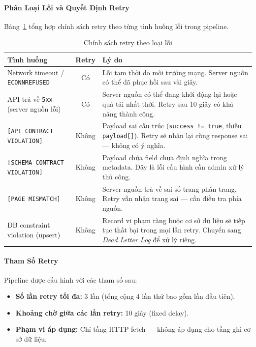 \paragraph{Phân Loại Lỗi và Quyết Định Retry}

Bảng~\ref{tab:retry-policy} tổng hợp chính sách retry theo từng tình huống
lỗi trong pipeline.

\begin{table}[H]
\centering
\caption{Chính sách retry theo loại lỗi}
\label{tab:retry-policy}
\renewcommand{\arraystretch}{1.4}
\begin{tabular}{|p{5cm}|c|p{7cm}|}
\hline
\textbf{Tình huống} & \textbf{Retry} & \textbf{Lý do} \\
\hline
Network timeout / \texttt{ECONNREFUSED} &  Có
    & Lỗi tạm thời do môi trường mạng. Server nguồn có thể đã phục hồi sau
      vài giây. \\
\hline
API trả về \texttt{5xx} (server nguồn lỗi) &  Có
    & Server nguồn có thể đang khởi động lại hoặc quá tải nhất thời. Retry
      sau 10 giây có khả năng thành công. \\
\hline
\texttt{[API CONTRACT VIOLATION]} &  Không
    & Payload sai cấu trúc (\texttt{success != true}, thiếu \texttt{payload[]}).
      Retry sẽ nhận lại cùng response sai — không có ý nghĩa. \\
\hline
\texttt{[SCHEMA CONTRACT VIOLATION]} &  Không
    & Payload chứa field chưa định nghĩa trong metadata. Đây là lỗi
      cấu hình cần admin xử lý thủ công. \\
\hline
\texttt{[PAGE MISMATCH]} &  Không
    & Server nguồn trả về sai số trang phân trang. Retry vẫn nhận trang
      sai — cần điều tra phía nguồn. \\
\hline
DB constraint violation (upsert) &  Không
    & Record vi phạm ràng buộc cơ sở dữ liệu sẽ tiếp tục thất bại trong
      mọi lần retry. Chuyển sang \textit{Dead Letter Log} để xử lý riêng. \\
\hline
\end{tabular}
\end{table}

\paragraph{Tham Số Retry}

Pipeline được cấu hình với các tham số sau:

\begin{itemize}
    \item \textbf{Số lần retry tối đa:} 3 lần (tổng cộng 4 lần thử bao gồm
    lần đầu tiên).
    \item \textbf{Khoảng chờ giữa các lần retry:} 10 giây (fixed delay).
    \item \textbf{Phạm vi áp dụng:} Chỉ tầng HTTP fetch — không áp dụng cho
    tầng ghi cơ sở dữ liệu.
\end{itemize}


